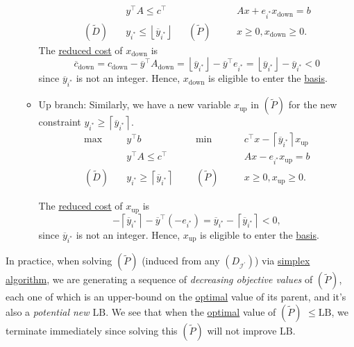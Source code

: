 \begin{remark}
\begin{itemize}
\begin{itemize}
\[\begin{alignedat}{5}
					      &y^{\top}A\leq c^{\top} 				&&		&&Ax + e_{i^{\ast}}x_{\text{down}} = b\\
					      (\widetilde{D})\quad& y_{i^{\ast}}\leq \left\lfloor \overline{y}_{i^{\ast}} \right\rfloor	&&(\widetilde{P})\quad&&x\geq 0, x_{\text{down}}\geq 0.
				      \end{alignedat}
			      \]
			      The \hyperref[def:reduced-cost]{reduced cost} of \(x_{\text{down}}\) is
			      \[
				      \overline{c}_{\text{down}}=c_{\text{down}}-\overline{y}^{\top}A_{\text{down}} = \left\lfloor \overline{y}_{i^{\ast}} \right\rfloor - \overline{y}^{\top}e_{i^{\ast}} = \left\lfloor \overline{y}_{i^{\ast}} \right\rfloor - \overline{y}_{i^{\ast}} < 0
			      \]
			      since \(\overline{y} _{i^{\ast} }\) is not an integer. Hence, \(x_{\text{down}}\) is eligible to enter the \hyperref[def:basic]{basis}.
			      \item\label{rmk:up-branch} Up branch: Similarly, we have a new variable \(x_{\text{up}}\) in \((\widetilde{P})\) for the new constraint
			      \(y_{i^{\ast}} \geq \left\lceil \overline{y} _{i^{\ast}} \right\rceil \).
			      \[
				      \begin{alignedat}{5}
					      \max ~	&y^{\top}b\qquad\qquad				&&\min~	&& c^{\top}x - \left\lceil \overline{y}_{i^{\ast}} \right\rceil x_{\text{up}}\\
					      &y^{\top}A\leq c^{\top} 				&&		&&Ax - e_{i^{\ast}} x_{\text{up}}= b                                      \\
					      (\widetilde{D})\quad& y_{i^{\ast}} \geq \left\lceil \overline{y} _{i^{\ast}} \right\rceil	&&(\widetilde{P})\quad&&x\geq 0, x_{\text{up}}\geq 0.
				      \end{alignedat}
			      \]

			      The \hyperref[def:reduced-cost]{reduced cost} of \(x_{\text{up}}\) is
			      \[
				      -\left\lceil \overline{y}_{i^{\ast}} \right\rceil - \overline{y}^{\top}(-e_{i^{\ast}}) = \overline{y}_{i^{\ast}} - \left\lceil \overline{y}_{i^{\ast}} \right\rceil < 0,
			      \]
			      since \(\overline{y} _{i^{\ast} }\) is not an integer. Hence, \(x_{\text{up}}\) is eligible to enter the \hyperref[def:basic]{basis}.
		      \end{itemize}
	\end{itemize}
\end{remark}

\begin{remark}
	In practice, when solving \((\widetilde{P})\) (induced from any \((D_{\mathcal{I} ^\prime})\)) via \hyperref[algo:simplex-algorithm]{simplex algorithm}, we are
	generating a sequence of \emph{decreasing objective values} of \((\widetilde{P})\), each one of which is an upper-bound on the \hyperref[def:optimal-solution]{optimal} value of its parent, and it's
	also a \emph{potential new \(\mathrm{LB}\)}. We see that when the \hyperref[def:optimal-solution]{optimal} value of \((\widetilde{P})\) \(\leq \mathrm{LB}\), we terminate immediately since solving this \((\widetilde{P})\) will not
	improve \(\mathrm{LB}\).
\end{remark}

